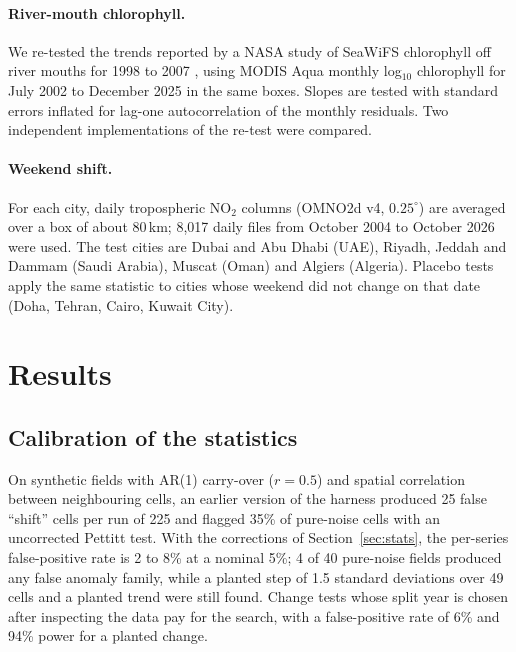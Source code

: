 \documentclass[11pt,a4paper]{article}
\begin{document}
\paragraph{River-mouth chlorophyll.} We re-tested the trends reported by a NASA study of SeaWiFS chlorophyll off river
mouths for 1998 to 2007 \citep{ntrs2009}, using MODIS Aqua monthly log$_{10}$ chlorophyll for July 2002 to December 2025 in
the same boxes. Slopes are tested with standard errors inflated for lag-one autocorrelation of the monthly residuals.
Two independent implementations of the re-test were compared.

\paragraph{Weekend shift.} For each city, daily tropospheric NO$_2$ columns (OMNO2d v4, $0.25^\circ$) are averaged over
a box of about 80\,km; 8{,}017 daily files from October 2004 to October 2026 were used. The test cities are Dubai and
Abu Dhabi (UAE), Riyadh, Jeddah and Dammam (Saudi Arabia), Muscat (Oman) and Algiers (Algeria). Placebo tests apply the
same statistic to cities whose weekend did not change on that date (Doha, Tehran, Cairo, Kuwait City).

\section{Results}
\label{sec:results}

\subsection{Calibration of the statistics}
On synthetic fields with AR(1) carry-over ($r = 0.5$) and spatial correlation between neighbouring cells, an earlier
version of the harness produced 25 false ``shift'' cells per run of 225 and flagged 35\% of pure-noise cells with an
uncorrected Pettitt test. With the corrections of Section~\ref{sec:stats}, the per-series false-positive rate is 2 to 8\%
at a nominal 5\%; 4 of 40 pure-noise fields produced any false anomaly family, while a planted step of 1.5 standard
deviations over 49 cells and a planted trend were still found. Change tests whose split year is chosen after
inspecting the data pay for the search, with a false-positive rate of 6\% and 94\% power for a planted change.
\end{document}
